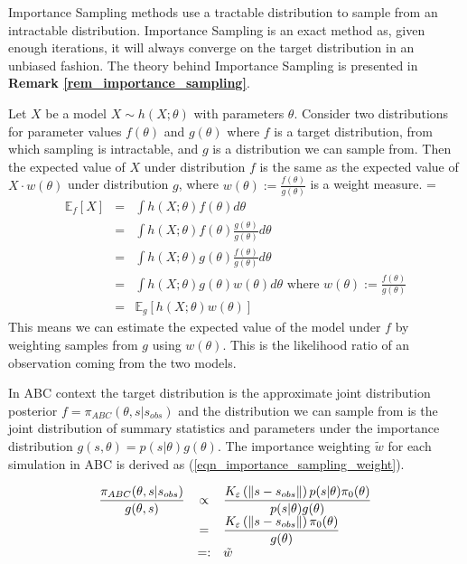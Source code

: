 \documentclass[11pt,a4paper]{article}
\newcommand*{\expect}{\mathbb{E}}
\theoremstyle{break}
\begin{document}

  \par Importance Sampling methods use a tractable distribution to sample from an intractable distribution. Importance Sampling is an exact method as, given enough iterations, it will always converge on the target distribution in an unbiased fashion. The theory behind Importance Sampling is presented in \textbf{Remark \ref{rem_importance_sampling}}.

  \begin{box_remark}\label{rem_importance_sampling}
    Let $X$ be a model $X\sim h(X;\theta)$ with parameters $\theta$. Consider two distributions for parameter values $f(\theta)$ and $g(\theta)$ where $f$ is a target distribution, from which sampling is intractable, and $g$ is a distribution we can sample from. Then the expected value of $X$ under distribution $f$ is the same as the expected value of $X\cdot w(\theta)$ under distribution $g$, where $w(\theta):=\frac{f(\theta)}{g(\theta)}$ is a weight measure.
    \everymath={\displaystyle}
    \[\begin{array}{rcl}
      \expect_f[X]&=&\int h(X;\theta)f(\theta)d\theta\\
      &=&\int h(X;\theta)f(\theta)\frac{g(\theta)}{g(\theta)}d\theta\\
      &=&\int h(X;\theta)g(\theta)\frac{f(\theta)}{g(\theta)}d\theta\\
      &=&\int h(X;\theta)g(\theta)w(\theta)d\theta\text{ where }w(\theta):=\frac{f(\theta)}{g(\theta)}\\
      &=&\expect_g[h(X;\theta)w(\theta)]
    \end{array}\]
    This means we can estimate the expected value of the model under $f$ by weighting samples from $g$ using $w(\theta)$. This is the likelihood ratio of an observation coming from the two models.
  \end{box_remark}

  \par In ABC context the target distribution is the approximate joint distribution posterior ${f=\pi_{ABC}(\theta,s|s_{obs})}$ and the distribution we can sample from is the joint distribution of summary statistics and parameters under the importance distribution $g(s,\theta)=p(s|\theta)g(\theta)$. The importance weighting $\tilde{w}$ for each simulation in ABC is derived as (\ref{eqn_importance_sampling_weight}).

  \begin{equation}\label{eqn_importance_sampling_weight}
    \everymath={\displaystyle}\begin{array}{rcl}
      \frac{\pi_{ABC}(\theta,s|s_{obs})}{g(\theta,s)}&\propto&\frac{K_\varepsilon\left(\|s-s_{obs}\|\right)p(s|\theta)\pi_0(\theta)}{p(s|\theta)g(\theta)}\\
      &=&\frac{K_\varepsilon\left(\|s-s_{obs}\|\right)\pi_0(\theta)}{g(\theta)}\\
      &=:&\tilde{w}
    \end{array}
  \end{equation}
\end{document}
